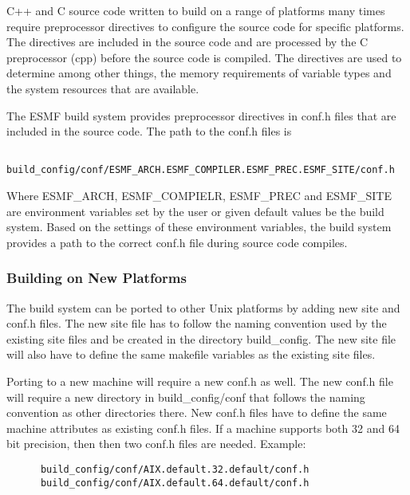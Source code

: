 C++ and C source code written to build on a range of platforms many
times require preprocessor directives to configure the source code for
specific platforms.  The directives are included in the source code
and are processed by the C preprocessor (cpp) before the source code
is compiled.  The directives are used to determine among other things,
the memory requirements of variable types and the system resources
that are available.

The ESMF build system provides preprocessor directives in conf.h files
that are included in the source code.  The path to the conf.h files is

\begin{verbatim}
    build_config/conf/ESMF_ARCH.ESMF_COMPILER.ESMF_PREC.ESMF_SITE/conf.h
\end{verbatim}

Where ESMF\_ARCH, ESMF\_COMPIELR, ESMF\_PREC and ESMF\_SITE are
environment variables set by the user or given default values be the
build system.  Based on the settings of these environment variables,
the build system provides a path to the correct conf.h file during
source code compiles.


\subsubsection{Building on New Platforms}

The build system can be ported to other Unix platforms by adding new
site and conf.h files.  The new site file has to follow the naming
convention used by the existing site files and be created in the
directory build\_config.  The new site file will also have to define
the same makefile variables as the existing site files.

Porting to a new machine will require a new conf.h as well. The new
conf.h file will require a new directory in build\_config/conf that
follows the naming convention as other directories there.
New conf.h files have to define the same machine attributes as
existing conf.h files.  If a machine supports both 32 and 64 bit
precision, then then two conf.h files are needed.  Example:

\begin{verbatim}
      build_config/conf/AIX.default.32.default/conf.h
      build_config/conf/AIX.default.64.default/conf.h
\end{verbatim}

